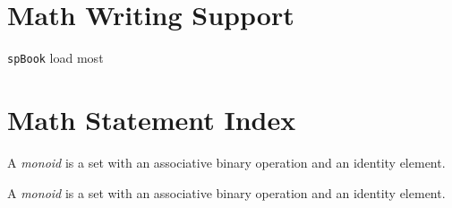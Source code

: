 
    \section{Math Writing Support}
        \texttt{spBook} load most

    \section{Math Statement Index}
        \begin{definition}[Monoid]
            A \emph{monoid} is a set with an associative binary operation and an identity element.
        \end{definition}
        \begin{theorem}[Schur]
            A \emph{monoid} is a set with an associative binary operation and an identity element.
        \end{theorem}